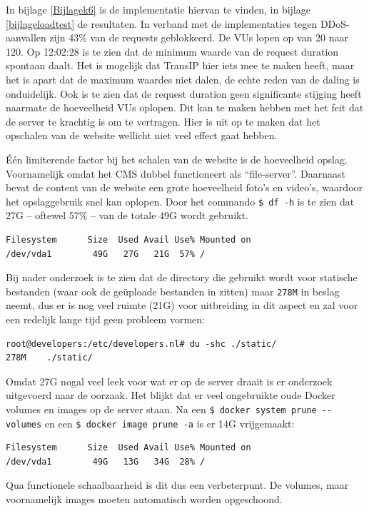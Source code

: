 In bijlage \ref{Bijlagek6} is de implementatie hiervan te vinden, in bijlage \ref{bijlageloadtest} de resultaten. In verband met de implementaties tegen DDoS-aanvallen zijn 43\% van de requests geblokkeerd. De VUs lopen op van 20 naar 120. Op 12:02:28 is te zien dat de minimum waarde van de request duration spontaan daalt. Het is mogelijk dat TransIP hier iets mee te maken heeft, maar het is apart dat de maximum waardes niet dalen, de echte reden van de daling is onduidelijk. Ook is te zien dat de request duration geen significante stijging heeft naarmate de hoeveelheid VUs oplopen. Dit kan te maken hebben met het feit dat de server te krachtig is om te vertragen. Hier is uit op te maken dat het opschalen van de website wellicht niet veel effect gaat hebben.

Één limiterende factor bij het schalen van de website is de hoeveelheid opslag. Voornamelijk omdat het CMS dubbel functioneert als \enquote{file-server}. Daarnaast bevat de content van de website een grote hoeveelheid foto's en video's, waardoor het opslaggebruik snel kan oplopen. Door het commando \texttt{\$ df -h} is te zien dat 27G -- oftewel 57\% -- van de totale 49G wordt gebruikt.
\begin{verbatim}
Filesystem      Size  Used Avail Use% Mounted on
/dev/vda1        49G   27G   21G  57% /
\end{verbatim}
Bij nader onderzoek is te zien dat de directory die gebruikt wordt voor statische bestanden (waar ook de geüploade bestanden in zitten) maar \texttt{278M} in beslag neemt, dus er is nog veel ruimte (21G) voor uitbreiding in dit aspect en zal voor een redelijk lange tijd geen probleem vormen:
\begin{verbatim}
root@developers:/etc/developers.nl# du -shc ./static/
278M	./static/
\end{verbatim}

Omdat 27G nogal veel leek voor wat er op de server draait is er onderzoek uitgevoerd naar de oorzaak. Het blijkt dat er veel ongebruikte oude Docker volumes en images op de server staan. Na een \texttt{\$ docker system prune -\--volumes} en een \texttt{\$ docker image prune -a} is er 14G vrijgemaakt:
\begin{verbatim}
Filesystem      Size  Used Avail Use% Mounted on
/dev/vda1        49G   13G   34G  28% /
\end{verbatim}
Qua functionele schaalbaarheid is dit dus een verbeterpunt. De volumes, maar voornamelijk images moeten automatisch worden opgeschoond.

